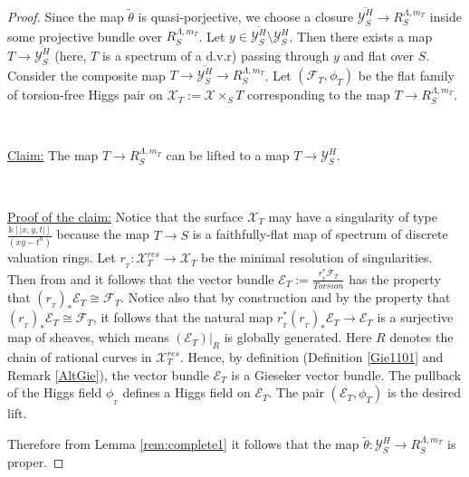 \documentclass[11pt]{amsart}
\theoremstyle{plain}
\numberwithin{equation}{section}
\theoremstyle{definition}
\theoremstyle{plain}
\begin{document}
\begin{proof}
    Since the map $\tilde{\theta}$ is quasi-porjective, we choose a closure $\overline{\mathcal Y^H_S}\longrightarrow R^{\Lambda, m_T}_S$ inside some projective bundle over $R^{\Lambda, m_T}_S$. Let $y\in \overline{\mathcal Y^H_S}\setminus {\mathcal Y^H_S}$. Then there exists a map $T\longrightarrow \overline{\mathcal Y^H_S}$ (here, $T$ is a spectrum of a d.v.r) passing through $y$ and flat over $S$. Consider the composite map $T\to \overline{\mathcal Y^H_S}\to R^{\Lambda, m_T}_S$. Let $(\mathcal F_T, \phi_T)$ be the flat family of torsion-free Higgs pair on $\mathcal X_T:=\mathcal X\times_S T$ corresponding to the map $T\to R^{\Lambda, m_T}_S$. 

    \
    
    \underline{Claim:} The map $T\to R^{\Lambda, m_T}_S$ can be lifted to a map $T\to \mathcal Y^H_S$. 

    \
    
    \underline{Proof of the claim:} Notice that the surface $\mathcal X_T$ may have a singularity of type $\frac{\mathbb k[|x,y,t|]}{(xy-t^n)}$ because the map $T\to S$ is a faithfully-flat map of spectrum  of discrete valuation rings. Let $r_{_T}: \mathcal X^{{res}}_T\longrightarrow \mathcal X_T$ be the minimal resolution of singularities. Then from \cite[Proposition 6.5]{Lip} and \cite[\S 4]{2a} it follows that the vector bundle $\mathcal E_T:=\frac{r_{_T}^*\mathcal F_T}{Torsion}$ has the property that $(r_{_T})_*\mathcal E_T\cong\mathcal F_T$. Notice also that by construction and by the property that $(r_{_T})_*\mathcal E_T\cong \mathcal F_T$, it follows that the natural map $r_{_T}^*(r_{_T})_*\mathcal E_T\longrightarrow \mathcal E_T$ is a surjective map of sheaves, which means $(\mathcal E_T)|_R$ is globally generated. Here $R$ denotes the chain of rational curves in $\mathcal X^{{res}}_T$. Hence, by definition (Definition \ref{Gie1101} and Remark \ref{AltGie}), the vector bundle $\mathcal E_T$ is a Gieseker vector bundle. The pullback of the Higgs field $\phi_{_T}$ defines a Higgs field on $\mathcal E_T$. The pair $(\mathcal E_T, \phi_T)$ is the desired lift. 

    Therefore from Lemma \ref{rem:complete1} it follows that the map $\tilde{\theta}: \mathcal Y^H_S\longrightarrow R^{\Lambda, m_T}_S$ is proper.  


    
\end{proof}


\noindent
\end{document}
